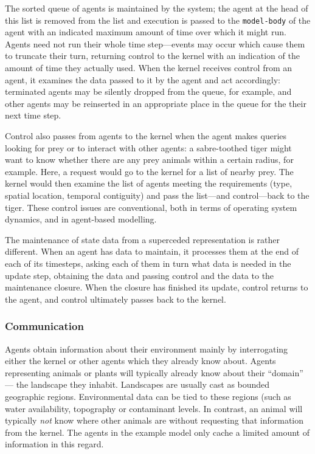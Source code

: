 The sorted queue of agents is maintained by the system; the agent at
the head of this list is removed from the list and execution is passed
to the \texttt{model-body} of the agent with an indicated maximum
amount of time over which it might run.  Agents need not run their
whole time step---events may occur which cause them to truncate their
turn, returning control to the kernel with an indication of the amount
of time they actually used.  When the kernel receives control from an
agent, it examines the data passed to it by the agent and act
accordingly: terminated agents may be silently dropped from the queue,
for example, and other agents may be reinserted in an appropriate
place in the queue for the their next time step.

Control also passes from agents to the kernel when the agent makes
queries looking for prey or to interact with other agents: a
sabre-toothed tiger might want to know whether there are any prey
animals within a certain radius, for example.  Here, a request would
go to the kernel for a list of nearby prey.  The kernel would then
examine the list of agents meeting the requirements (type, spatial
location, temporal contiguity) and pass the list---and control---back
to the tiger.  These control issues are conventional, both in terms of
operating system dynamics, and in agent-based modelling.

The maintenance of state data from a superceded representation is
rather different. When an agent has data to maintain, it processes
them at the end of each of its timesteps, asking each of them in turn
what data is needed in the update step, obtaining the data and passing
control and the data to the maintenance closure. When the closure has
finished its update, control returns to the agent, and control
ultimately passes back to the kernel.

\subsubsection{Communication}
Agents obtain information about their environment mainly by
interrogating either the kernel or other agents which they already
know about.  Agents representing animals or plants will typically
already know about their ``domain'' --- the landscape they inhabit.
Landscapes are usually cast as bounded geographic
regions. Environmental data can be tied to these regions (such as
water availability, topography or contaminant levels. In contrast, an
animal will typically \emph{not} know where other animals are without
requesting that information from the kernel.  The agents in the
example model only cache a limited amount of information in this
regard.

